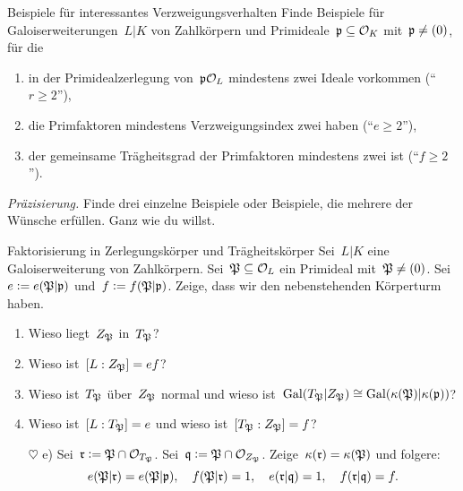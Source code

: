 \documentclass{uebblatt}
\begin{document}

\begin{aufgabe}{Beispiele für interessantes Verzweigungsverhalten}
Finde Beispiele für Galoiserweiterungen~$L|K$ von Zahlkörpern und
Primideale~$\mathfrak{p} \subseteq \mathcal{O}_K$ mit~$\mathfrak{p} \neq (0)$, für die
\begin{enumerate}
\item in der Primidealzerlegung von~$\mathfrak{p}\mathcal{O}_L$ mindestens zwei Ideale vorkommen
("`$r \geq 2$"'),
\item die Primfaktoren mindestens Verzweigungsindex zwei haben ("`$e \geq 2$"'),
\item der gemeinsame Trägheitsgrad der Primfaktoren mindestens zwei ist ("`$f \geq 2$"').
\end{enumerate}
{\tiny\emph{Präzisierung.} Finde drei einzelne Beispiele oder Beispiele, die
mehrere der Wünsche erfüllen. Ganz wie du willst.\par}
\end{aufgabe}

\begin{aufgabe}{Faktorisierung in Zerlegungskörper und Trägheitskörper}
Sei~$L|K$ eine Galoiserweiterung von Zahlkörpern. Sei~$\mathfrak{P} \subseteq \mathcal{O}_L$ ein
Primideal mit~$\mathfrak{P} \neq (0)$. Sei~$e \vcentcolon= e(\mathfrak{P}|\mathfrak{p})$ und~$f \vcentcolon= f(\mathfrak{P}|\mathfrak{p})$.
Zeige, dass wir den nebenstehenden Körperturm haben.
\begin{enumerate}
\item Wieso liegt~$Z_{\mathfrak{P}}$ in~$T_{\mathfrak{P}}$?
\item Wieso ist~$[L : Z_{\mathfrak{P}}] = ef$?
\item Wieso ist~$T_{\mathfrak{P}}$ über~$Z_{\mathfrak{P}}$ normal und wieso ist~$\mathrm{Gal}(T_{\mathfrak{P}}|Z_{\mathfrak{P}}) \cong \mathrm{Gal}(\kappa(\mathfrak{P})|\kappa(\mathfrak{p}))$?
\item Wieso ist~$[L : T_{\mathfrak{P}}] = e$ und wieso ist~$[T_{\mathfrak{P}} : Z_{\mathfrak{P}}] = f$?
\item[$\heartsuit$ e)] Sei~$\mathfrak{r} \vcentcolon= \mathfrak{P} \cap \mathcal{O}_{T_{\mathfrak{P}}}$.
Sei~$\mathfrak{q} \vcentcolon= \mathfrak{P} \cap \mathcal{O}_{Z_{\mathfrak{P}}}$. Zeige~$\kappa(\mathfrak{r}) = \kappa(\mathfrak{P})$ und folgere:
\[ e(\mathfrak{P}|\mathfrak{r}) = e(\mathfrak{P}|\mathfrak{p}), \quad
  f(\mathfrak{P}|\mathfrak{r}) = 1, \quad
  e(\mathfrak{r}|\mathfrak{q}) = 1, \quad
  f(\mathfrak{r}|\mathfrak{q}) = f. \]
\end{enumerate}
\end{aufgabe}
\end{document}
